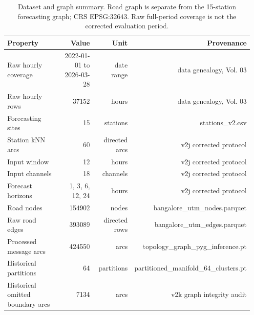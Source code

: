 \begin{table}[t]
\centering
\footnotesize
\caption{Dataset and graph summary. Road graph is separate from the 15-station forecasting graph; CRS EPSG:32643. Raw full-period coverage is not the corrected evaluation period.}
\label{tab:t01}
\begin{tabular}{lrrr}
\hline
Property & Value & Unit & Provenance \\
\hline
Raw hourly coverage & 2022-01-01 to 2026-03-28 & date range & data genealogy, Vol. 03 \\
Raw hourly rows & 37152 & hours & data genealogy, Vol. 03 \\
Forecasting sites & 15 & stations & stations\_v2.csv \\
Station kNN arcs & 60 & directed arcs & v2j corrected protocol \\
Input window & 12 & hours & v2j corrected protocol \\
Input channels & 18 & channels & v2j corrected protocol \\
Forecast horizons & 1, 3, 6, 12, 24 & hours & v2j corrected protocol \\
Road nodes & 154902 & nodes & bangalore\_utm\_nodes.parquet \\
Raw road edges & 393089 & directed rows & bangalore\_utm\_edges.parquet \\
Processed message arcs & 424550 & arcs & topology\_graph\_pyg\_inference.pt \\
Historical partitions & 64 & partitions & partitioned\_manifold\_64\_clusters.pt \\
Historical omitted boundary arcs & 7134 & arcs & v2k graph integrity audit \\
\hline
\end{tabular}
\end{table}
